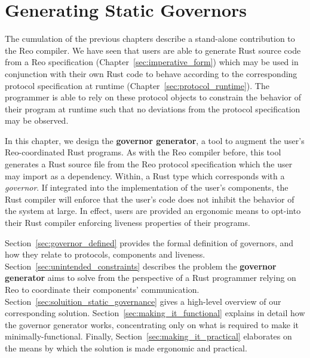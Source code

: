 \chapter{Generating Static Governors}
\label{sec:api}

The cumulation of the previous chapters describe a stand-alone contribution to the Reo compiler. We have seen that users are able to generate Rust source code from a Reo specification (Chapter~\ref{sec:imperative_form}) which may be used in conjunction with their own Rust code to behave according to the corresponding protocol specification at runtime (Chapter~\ref{sec:protocol_runtime}). The programmer is able to rely on these protocol objects to constrain the behavior of their program at runtime such that no deviations from the protocol specification may be observed. 

In this chapter, we design the \textbf{governor generator}, a tool to augment the user's Reo-coordinated Rust programs. As with the Reo compiler before, this tool generates a Rust source file from the Reo protocol specification which the user may import as a dependency. Within, a Rust type which corresponds with a \textit{governor}. If integrated into the implementation of the user's components, the Rust compiler will enforce that the user's code does not inhibit the behavior of the system at large. In effect, users are provided an ergonomic means to opt-into their Rust compiler enforcing liveness properties of their programs. 

Section~\ref{sec:governor_defined} provides the formal definition of governors, and how they relate to protocols, components and liveness. Section~\ref{sec:unintended_constraints} describes the problem the \textbf{governor generator} aims to solve from the perspective of a Rust programmer relying on Reo to coordinate their components' communication. Section~\ref{sec:soluition_static_governance} gives a high-level overview of our corresponding solution. Section~\ref{sec:making_it_functional} explains in detail how the governor generator works, concentrating only on what is required to make it minimally-functional. Finally, Section~\ref{sec:making_it_practical} elaborates on the means by which the solution is made ergonomic and practical.

